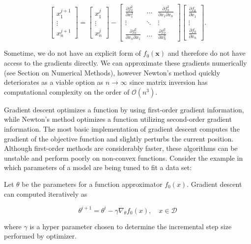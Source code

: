 \begin{equation*}
    \begin{bmatrix}
        x_1^{j+1} \\
        \vdots \\
        x_n^{j+1}
    \end{bmatrix} = 
    \begin{bmatrix}
        x_1^{j} \\
        \vdots \\
        x_n^{j}
    \end{bmatrix} - 
    \begin{bmatrix}
        \frac{\partial f_0^2}{\partial x_1^2} & \ldots & \frac{\partial f_0^2}{\partial x_1 \partial x_n} \\
        \vdots & \ddots & \vdots \\
        \frac{\partial f_0^2}{\partial x_n \partial x_1} & \ldots & \frac{\partial f_0^2}{\partial x_n^2}
    \end{bmatrix}
    \begin{bmatrix}
        \frac{\partial f_0}{\partial x_1} \\
        \vdots \\
        \frac{\partial f_0}{\partial x_n}
    \end{bmatrix}. 
\end{equation*}

Sometime, we do not have an explicit form of $f_0(\boldsymbol{x})$ and therefore do not have access to the gradients directly. We can approximate these gradients numerically (see Section on Numerical Methods), however Newton's method quickly deteriorates as a viable option as $n \rightarrow \infty$ since matrix inversion has computational complexity on the order of $\mathcal{O}(n^3)$. 




Gradient descent optimizes a function by using first-order gradient information, while Newton's method optimizes a function utilizing second-order gradient information. The most basic implementation of gradient descent computes the gradient of the objective function and slightly perturbs the current position. Although first-order methods are considerably faster, these algorithms can be unstable and perform poorly on non-convex functions. Consider the example in which parameters of a model are being tuned to fit a data set:

\begin{tcolorbox}[colback=green!5!white,colframe=green!75!black]
Let $\theta$ be the parameters for a function approximator $f_0(x)$. Gradient descent can computed iteratively as 

\begin{equation*}
    \theta^{i+1} = \theta^i - \gamma \nabla_\theta f_0(x), \quad x \in \mathcal{D}
\end{equation*}

where $\gamma$ is a hyper parameter chosen to determine the incremental step size performed by optimizer.

\end{tcolorbox}

